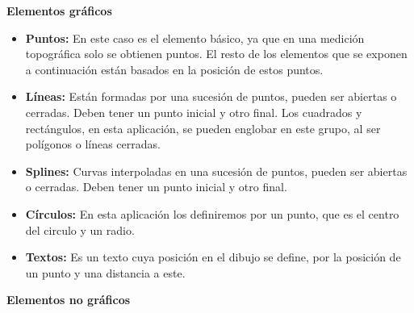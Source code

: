 \textbf {Elementos gráficos}
\begin{itemize}
\item\textbf{Puntos:} En este caso es el elemento básico, ya que en una medición topográfica solo se obtienen puntos. El resto de los elementos que se exponen a continuación están basados en la posición de estos puntos.

\item\textbf{Líneas:} Están formadas por una sucesión de puntos, pueden ser abiertas o cerradas. Deben tener un punto inicial y otro final. Los cuadrados y rectángulos, en esta aplicación, se pueden englobar en este grupo, al ser polígonos o líneas cerradas.

\item\textbf{Splines:} Curvas interpoladas en una sucesión de puntos, pueden ser abiertas o cerradas. Deben tener un punto inicial y otro final.

\item\textbf{Círculos:} En esta aplicación los definiremos por un punto, que es el centro del circulo y un radio.

\item\textbf{Textos:} Es un texto cuya posición en el dibujo se define, por la posición de un punto y una distancia a este.

\end{itemize}

\textbf {Elementos no gráficos}

